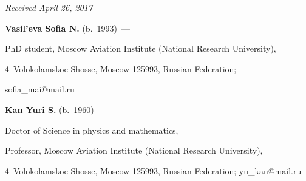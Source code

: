 \vspace*{-3pt}



\hfill{\small\textit{Received April 26, 2017}}






\Contr





\noindent

\textbf{Vasil'eva Sofia N.} (b.\ 1993)~--- 

PhD student, Moscow Aviation Institute (National Research University), 

4~Volokolamskoe  Shosse, Moscow 125993, Russian Federation; 

\mbox{sofia\_mai@mail.ru}



\vspace*{3pt}



\noindent

\textbf{Kan Yuri S.} (b.\ 1960)~--- 

Doctor of Science in physics and mathematics, 

Professor, Moscow Aviation Institute (National Research University), 

4~Volokolamskoe  Shosse, Moscow 125993, Russian Federation; \mbox{yu\_kan@mail.ru}



\label{end\stat}





\renewcommand{\bibname}{\protect\rm Литература} 

